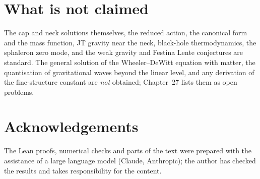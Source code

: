 \section*{What is not claimed}
The cap and neck solutions themselves, the reduced action, the canonical form and the mass function, JT gravity near the neck, black-hole thermodynamics, the sphaleron zero mode, and the weak gravity and Festina Lente conjectures are standard.
The general solution of the Wheeler--DeWitt equation with matter, the quantisation of gravitational waves beyond the linear level, and any derivation of the fine-structure constant are \emph{not} obtained; Chapter~27 lists them as open problems.

\section*{Acknowledgements}
The Lean proofs, numerical checks and parts of the text were prepared with the assistance of a large language model (Claude, Anthropic); the author has checked the results and takes responsibility for the content.
